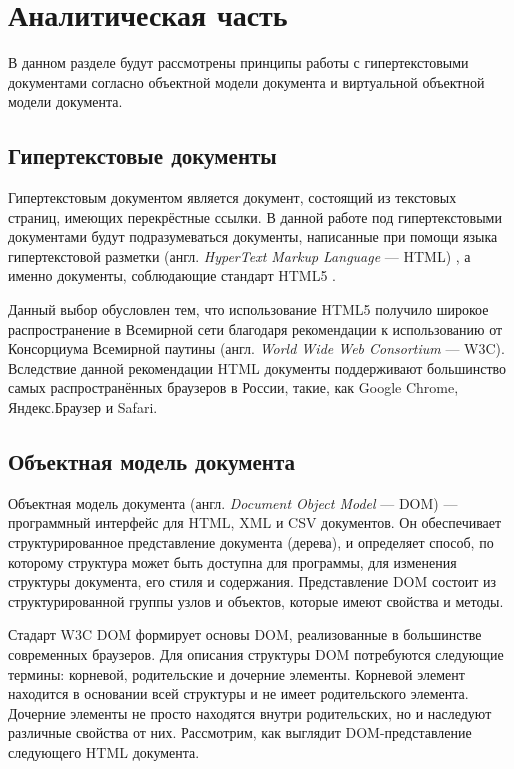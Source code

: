 \section{Аналитическая часть}

В данном разделе будут рассмотрены принципы работы с гипертекстовыми документами согласно объектной модели документа и виртуальной объектной модели документа.

\subsection{Гипертекстовые документы}

Гипертекстовым документом является документ, состоящий из текстовых страниц, имеющих перекрёстные ссылки. 
В данной работе под гипертекстовыми документами будут подразумеваться документы, написанные при помощи языка гипертекстовой разметки (англ. \textit{HyperText Markup Language} --- HTML) \cite{html}, а именно документы, соблюдающие стандарт HTML5 \cite{html-doc}.


Данный выбор обусловлен тем, что использование HTML5 получило широкое распространение в Всемирной сети благодаря рекомендации \cite{html-recommendation} к использованию от Консорциума Всемирной паутины (англ. \textit{World Wide Web Consortium} --- W3C).
Вследствие данной рекомендации HTML документы поддерживают большинство самых распространённых браузеров в России, такие, как Google Chrome, Яндекс.Браузер и Safari. 

\subsection{Объектная модель документа}
Объектная модель документа (англ. \textit{Document Object Model} --- DOM) \cite{dom} --- программный интерфейс для HTML, XML и CSV документов. 
Он обеспечивает структурированное представление документа (дерева), и определяет способ, по которому структура может быть доступна для программы, для изменения структуры документа, его стиля и содержания.
Представление DOM состоит из структурированной группы узлов и объектов, которые имеют свойства и методы.

Стадарт W3C DOM \cite{dom-doc} формирует основы DOM, реализованные в большинстве современных браузеров. 
Для описания структуры DOM потребуются следующие термины: корневой, родительские и дочерние элементы. 
Корневой элемент находится в основании всей структуры и не имеет родительского элемента.
Дочерние элементы не просто находятся внутри родительских, но и наследуют различные свойства от них.
Рассмотрим, как выглядит DOM-представление следующего HTML документа. 

